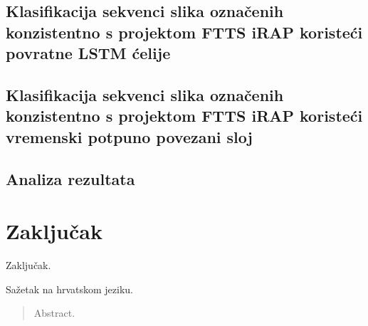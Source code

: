 \documentclass[times, utf8, diplomski, numeric]{fer}
\begin{document}
\section{Klasifikacija sekvenci slika označenih konzistentno s projektom FTTS iRAP koristeći povratne LSTM ćelije}

\section{Klasifikacija sekvenci slika označenih konzistentno s projektom FTTS iRAP koristeći vremenski potpuno povezani sloj}

\section{Analiza rezultata}

\chapter{Zaključak}
Zaključak.




\begin{sazetak}
Sažetak na hrvatskom jeziku.

\end{sazetak}

\begin{abstract}
Abstract.

\end{abstract}
\end{document}
